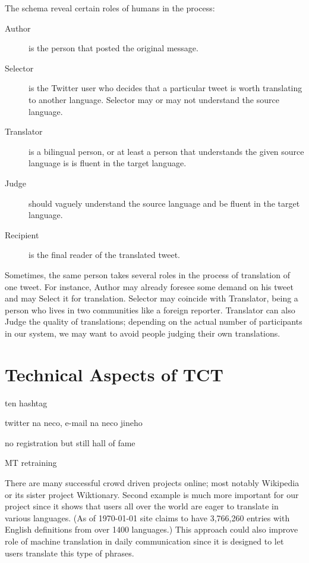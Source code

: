 \documentclass[11pt]{article}
\begin{document}
The schema reveal certain roles of humans in the process:

\begin{description}
\item[Author] is the person that posted the original message.
\item[Selector] is the Twitter user who decides that a particular tweet is worth
translating to another language. Selector may or may not understand the source
language.
\item[Translator] is a bilingual person, or at least a person that understands
the given source language is is fluent in the target language.
\item[Judge] should vaguely understand the source language and be fluent in the
target language.
\item[Recipient] is the final reader of the translated tweet.
\end{description}

Sometimes, the same person takes several roles in the process of translation of
one tweet. For instance, Author may already foresee some demand on his tweet and
may Select it for translation. Selector may coincide with Translator, being a
person who lives in two communities like a foreign reporter. Translator can also
Judge the quality of translations; depending on the actual number of 
participants in our system, we may want to avoid people judging their own
translations.



\section{Technical Aspects of TCT}
\label{implementation}

ten hashtag

twitter na neco, e-mail na neco jineho

no registration but still hall of fame

MT retraining

There are many successful crowd driven projects online; most notably Wikipedia
or its sister project Wiktionary. Second example is much more important for our
project since it shows that users all over the world are eager to translate in
various languages. (As of \today{ }site claims to have 3,766,260 entries with
English definitions from over 1400 languages.) This approach could also improve
role of machine translation in daily communication since it is designed to let
users translate this type of phrases.
%
\end{document}
